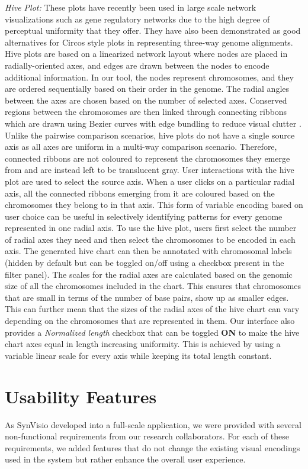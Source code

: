 \textit{Hive Plot:} These plots have recently been used in large scale network visualizations such as gene regulatory networks due to the high degree of perceptual uniformity that they offer\cite{krzywinski2011hive}. They have also been demonstrated as good alternatives for Circos \cite{krzywinski2009circos} style plots in representing three-way genome alignments. Hive plots are based on a linearized network layout where nodes are placed in radially-oriented axes, and edges are drawn between the nodes to encode additional information. In our tool, the nodes represent chromosomes, and they are ordered sequentially based on their order in the genome. The radial angles between the axes are chosen based on the number of selected axes. Conserved regions between the chromosomes are then linked through connecting ribbons which are drawn using Bezier curves with edge bundling to reduce visual clutter \cite{zhou2013edge}. Unlike the pairwise comparison scenarios, hive plots do not have a single source axis as all axes are uniform in a multi-way comparison scenario. Therefore, connected ribbons are not coloured to represent the chromosomes they emerge from and are instead left to be translucent gray. User interactions with the hive plot are used to select the source axis. When a user clicks on a particular radial axis, all the connected ribbons emerging from it are coloured based on the chromosomes they belong to in that axis. This form of variable encoding based on user choice can be useful in selectively identifying patterns for every genome represented in one radial axis. To use the hive plot, users first select the number of radial axes they need and then select the chromosomes to be encoded in each axis. The generated hive chart can then be annotated with chromosomal labels (hidden by default but can be toggled on/off using a checkbox present in the filter panel). The scales for the radial axes are calculated based on the genomic size of all the chromosomes included in the chart. This ensures that chromosomes that are small in terms of the number of base pairs, show up as smaller edges. This can further mean that the sizes of the radial axes of the hive chart can vary depending on the chromosomes that are represented in them. Our interface also provides a \textit{Normalized length} checkbox that can be toggled \textbf{ON} to make the hive chart axes equal in length increasing uniformity. This is achieved by using a variable linear scale for every axis while keeping its total length constant.

\section{Usability Features}
As SynVisio developed into a full-scale application, we were provided with several non-functional requirements from our research collaborators. For each of these requirements, we added features that do not change the existing visual encodings used in the system but rather enhance the overall user experience. 

